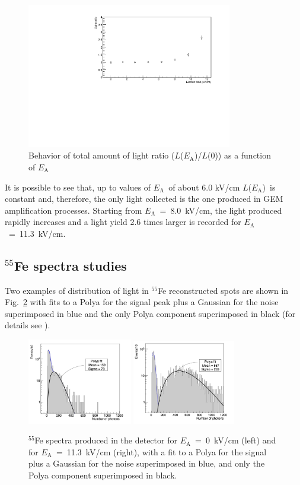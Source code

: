 \documentclass[a4paper,11pt]{article}
\newcommand{\Ea}  {$E_{\mathrm{A}}$}
\newcommand{\La}  {$L$(\Ea)}
\begin{document}
\begin{figure}[h!]
\centering
\includegraphics[width=0.80\textwidth]{gLightNorm.pdf}
\caption{Behavior of total amount of light ratio ($L$(\Ea)/$L$(0)) as a function of \Ea} 
\label{fig:light}
\end{figure}

It is possible to see that, up to values of \Ea\ of about 6.0 kV/cm \La\ is constant and, therefore, the only light collected is the one produced in GEM amplification processes. Starting from 
\Ea~=~8.0~kV/cm, the light produced rapidly increases and a light yield 2.6 times larger is recorded for \Ea~=~11.3~kV/cm.

\subsection{$^{55}$Fe spectra studies}
\label{sec:55fe}
Two examples of distribution of light in $^{55}$Fe reconstructed spots are shown in Fig.~\ref{fig:qIn} with  fits to a Polya for the signal peak plus a Gaussian for the noise superimposed in blue and the only Polya component superimposed in black (for details see \cite{bib:fe55}).

\begin{figure}[h!]
\centering
\includegraphics[width=0.407\textwidth]{hqIn_3540.png}
\includegraphics[width=0.4\textwidth]{hqIn_3629.png}
\caption{$^{55}$Fe spectra produced in the detector for \Ea~=~0~kV/cm (left) and for \Ea~=~11.3~kV/cm (right), with a fit to a Polya for the signal plus a Gaussian for the noise superimposed in blue, and only the Polya component superimposed
in black.} 
\label{fig:qIn}
\end{figure}
\end{document}
